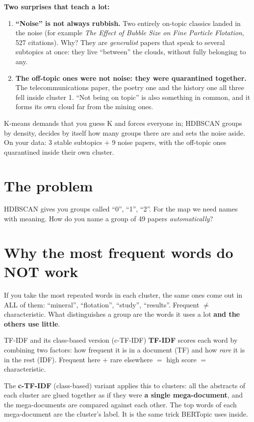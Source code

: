\documentclass[11pt,a4paper]{article}
\begin{document}
\begin{ojo}
\textbf{Two surprises that teach a lot:}
\begin{enumerate}
  \item \textbf{``Noise'' is not always rubbish.} Two entirely on-topic classics landed in the
        noise (for example \emph{The Effect of Bubble Size on Fine Particle Flotation}, 527
        citations). Why? They are \emph{generalist} papers that speak to several subtopics at
        once: they live ``between'' the clouds, without fully belonging to any.
  \item \textbf{The off-topic ones were not noise: they were quarantined together.} The
        telecommunications paper, the poetry one and the history one all three fell inside
        cluster 1. ``Not being on topic'' is also something in common, and it forms its own
        cloud far from the mining ones.
\end{enumerate}
\end{ojo}

\begin{resumen}
K-means demands that you guess K and forces everyone in; HDBSCAN groups by density, decides by
itself how many groups there are and sets the noise aside. On your data: 3 stable subtopics
$+$ 9 noise papers, with the off-topic ones quarantined inside their own cluster.
\end{resumen}
\clearpage
{}
{}

\section{The problem}

HDBSCAN gives you groups called ``0'', ``1'', ``2''. For the map we need names with meaning.
How do you name a group of 49 papers \emph{automatically}?

\section{Why the most frequent words do NOT work}

If you take the most repeated words in each cluster, the same ones come out in ALL of them:
``mineral'', ``flotation'', ``study'', ``results''. Frequent $\neq$ characteristic. What
distinguishes a group are the words it uses a lot \textbf{and the others use little}.

\begin{concepto}{TF-IDF and its class-based version (c-TF-IDF)}
\textbf{TF-IDF} scores each word by combining two factors: how frequent it is in a document
(TF) and how \emph{rare} it is in the rest (IDF). Frequent here $+$ rare elsewhere $=$ high
score $=$ characteristic.

The \textbf{c-TF-IDF} (class-based) variant applies this to clusters: all the abstracts of
each cluster are glued together as if they were \textbf{a single mega-document}, and the
mega-documents are compared against each other. The top words of each mega-document are the
cluster's label. It is the same trick BERTopic uses inside.
\end{concepto}
\end{document}
